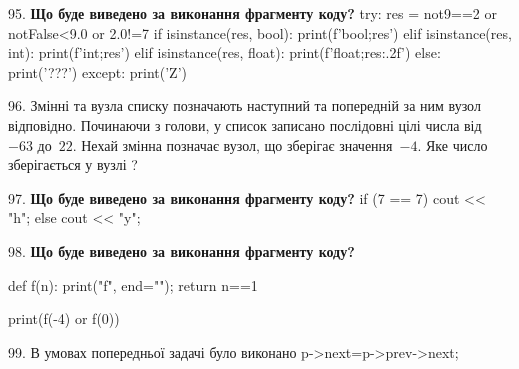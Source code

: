 \documentclass[11pt]{article}
\begin{document}
\par\vspace{5mm}
95. \textbf{Що буде виведено за виконання фрагменту коду?}
try:
    res = not9==2 or notFalse<9.0 or 2.0!=7
    if isinstance(res, bool):
        print(f'bool;{res}')
    elif isinstance(res, int):
        print(f'int;{res}')
    elif isinstance(res, float):
        print(f'float;{res:.2f}')
    else:
        print('???')
except:
    print('Z')
\par\vspace{5mm}
96. 
Змінні  та  вузла списку позначають наступний та попередній за ним вузол відповідно. Починаючи з голови, у список записано послідовні цілі числа від~$-63$ до~$22$. Нехай змінна  позначає вузол, що зберігає значення~$-4$.
Яке число зберігається у вузлі  ?
\par\vspace{5mm}
97. \textbf{Що буде виведено за виконання фрагменту коду?}
if (7 == 7)
    cout << "h";
else
    cout << "y";

\par\vspace{5mm}
98. \textbf{Що буде виведено за виконання фрагменту коду?}

def f(n):
    print("f", end="");
    return n==1

print(f(-4) or f(0))
\par\vspace{5mm}
99. 
В умовах попередньої задачі було виконано p->next=p->prev->next;
\end{document}
